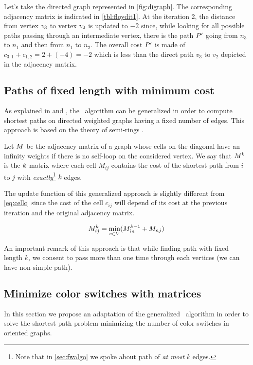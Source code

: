 

Let's take the directed graph represented in \cref{fig:digraph}. The corresponding adjacency matrix is indicated in \cref{tbl:floydit1}. At the iteration 2, the distance from vertex $v_3$ to vertex $v_2$ is updated to $-2$ since, while looking for all possible paths passing through an intermediate vertex, there is the path $P'$ going from $n_3$ to $n_1$ and then from $n_1$ to $n_2$. The overall cost $P'$ is made of $c_{3,1} + c_{1,2} = 2 + (-4) = -2$ which is less than the direct path $v_3$ to $v_2$ depicted in the adjacency matrix.

\subsection{Paths of fixed length with minimum cost}

As explained in \cite{floydGeneric} and \cite{cpweb}, the \FW\ algorithm can be generalized in order to compute shortest paths on directed weighted graphs having a fixed number of edges. This approach is based on the theory of semi-rings \cite{ullman}.

Let $M$ be the adjacency matrix of a graph whose cells on the diagonal have an infinity weights if there is no self-loop on the considered vertex. We say that $M^k$ is the $k$-matrix where each cell $M_{ij}$ contains the cost of the shortest path from $i$ to $j$ with \textit{exactly}\footnote{Note that in \cref{sec:fwalgo} we spoke about path of \textit{at most} $k$ edges.} $k$ edges.

The update function of this generalized approach is slightly different from \cref{eq:cellc} since the cost of the cell $c_{ij}$ will depend of its cost at the previous iteration and the original adjacency matrix.

\begin{equation}
  M^k_{ij} = \min_{v \in V} (M^{k-1}_{in} + M_{nj})
\end{equation}

An important remark of this approach is that while finding path with fixed length $k$, we consent to pass more than one time through each vertices (\ie we can have non-simple path).

\subsection{Minimize color switches with matrices}

In this section we propose an adaptation of the generalized \FW\ algorithm in order to solve the shortest path problem minimizing the number of color switches in oriented graphs.

